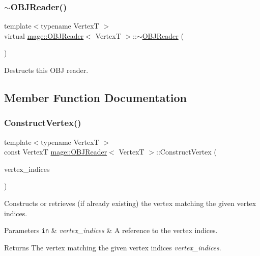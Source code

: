 \subsubsection{\texorpdfstring{$\sim$\+O\+B\+J\+Reader()}{~OBJReader()}}
{\footnotesize\ttfamily template$<$typename VertexT $>$ \\
virtual \hyperlink{classmage_1_1_o_b_j_reader}{mage\+::\+O\+B\+J\+Reader}$<$ VertexT $>$\+::$\sim$\hyperlink{classmage_1_1_o_b_j_reader}{O\+B\+J\+Reader} (\begin{DoxyParamCaption}{ }\end{DoxyParamCaption})\hspace{0.3cm}{\ttfamily [virtual]}}

Destructs this O\+BJ reader. 

\subsection{Member Function Documentation}
\hypertarget{classmage_1_1_o_b_j_reader_aa899d5657f913d488cc748fd49ccee60}{}\label{classmage_1_1_o_b_j_reader_aa899d5657f913d488cc748fd49ccee60} 
\subsubsection{\texorpdfstring{Construct\+Vertex()}{ConstructVertex()}}
{\footnotesize\ttfamily template$<$typename VertexT $>$ \\
const VertexT \hyperlink{classmage_1_1_o_b_j_reader}{mage\+::\+O\+B\+J\+Reader}$<$ VertexT $>$\+::Construct\+Vertex (\begin{DoxyParamCaption}\item[{const X\+M\+U\+I\+N\+T3 \&}]{vertex\+\_\+indices }\end{DoxyParamCaption})\hspace{0.3cm}{\ttfamily [private]}}

Constructs or retrieves (if already existing) the vertex matching the given vertex indices.


\begin{DoxyParams}[1]{Parameters}
\mbox{\tt in}  & {\em vertex\+\_\+indices} & A reference to the vertex indices. \\
\hline
\end{DoxyParams}
\begin{DoxyReturn}{Returns}
The vertex matching the given vertex indices {\itshape vertex\+\_\+indices}. 
\end{DoxyReturn}
\hypertarget{classmage_1_1_o_b_j_reader_ae3bac172c4179c56fff8a5b0261a54a3}{}\label{classmage_1_1_o_b_j_reader_ae3bac172c4179c56fff8a5b0261a54a3} 
